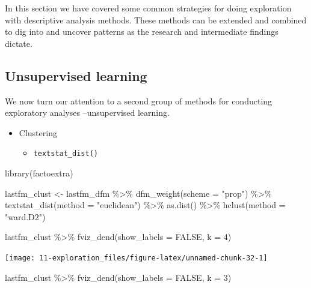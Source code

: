 \documentclass[
]{article}
\newenvironment{Shaded}{\begin{snugshade}}{\end{snugshade}}
\newcommand{\AttributeTok}[1]{\textcolor[rgb]{0.77,0.63,0.00}{#1}}
\newcommand{\ConstantTok}[1]{\textcolor[rgb]{0.00,0.00,0.00}{#1}}
\newcommand{\DecValTok}[1]{\textcolor[rgb]{0.00,0.00,0.81}{#1}}
\newcommand{\FunctionTok}[1]{\textcolor[rgb]{0.00,0.00,0.00}{#1}}
\newcommand{\NormalTok}[1]{#1}
\newcommand{\OtherTok}[1]{\textcolor[rgb]{0.56,0.35,0.01}{#1}}
\newcommand{\SpecialCharTok}[1]{\textcolor[rgb]{0.00,0.00,0.00}{#1}}
\newcommand{\StringTok}[1]{\textcolor[rgb]{0.31,0.60,0.02}{#1}}
\providecommand{\tightlist}{%
  \setlength{\itemsep}{0pt}\setlength{\parskip}{0pt}}
\begin{document}
In this section we have covered some common strategies for doing exploration with descriptive analysis methods. These methods can be extended and combined to dig into and uncover patterns as the research and intermediate findings dictate.

\hypertarget{unsupervised-learning}{%
\subsection{Unsupervised learning}\label{unsupervised-learning}}

We now turn our attention to a second group of methods for conducting exploratory analyses --unsupervised learning.

\begin{itemize}
\tightlist
\item
  Clustering

  \begin{itemize}
  \tightlist
  \item
    \texttt{textstat\_dist()}
  \end{itemize}
\end{itemize}

\begin{Shaded}
\begin{Highlighting}[]
\FunctionTok{library}\NormalTok{(factoextra)}

\NormalTok{lastfm\_clust }\OtherTok{\textless{}{-}}\NormalTok{ lastfm\_dfm }\SpecialCharTok{\%\textgreater{}\%}
    \FunctionTok{dfm\_weight}\NormalTok{(}\AttributeTok{scheme =} \StringTok{"prop"}\NormalTok{) }\SpecialCharTok{\%\textgreater{}\%}
    \FunctionTok{textstat\_dist}\NormalTok{(}\AttributeTok{method =} \StringTok{"euclidean"}\NormalTok{) }\SpecialCharTok{\%\textgreater{}\%}
    \FunctionTok{as.dist}\NormalTok{() }\SpecialCharTok{\%\textgreater{}\%}
    \FunctionTok{hclust}\NormalTok{(}\AttributeTok{method =} \StringTok{"ward.D2"}\NormalTok{)}

\NormalTok{lastfm\_clust }\SpecialCharTok{\%\textgreater{}\%}
    \FunctionTok{fviz\_dend}\NormalTok{(}\AttributeTok{show\_labels =} \ConstantTok{FALSE}\NormalTok{, }\AttributeTok{k =} \DecValTok{4}\NormalTok{)}
\end{Highlighting}
\end{Shaded}

\begin{center}\texttt{[image: 11-exploration\_files/figure-latex/unnamed-chunk-32-1]} \end{center}

\begin{Shaded}
\begin{Highlighting}[]
\NormalTok{lastfm\_clust }\SpecialCharTok{\%\textgreater{}\%}
    \FunctionTok{fviz\_dend}\NormalTok{(}\AttributeTok{show\_labels =} \ConstantTok{FALSE}\NormalTok{, }\AttributeTok{k =} \DecValTok{3}\NormalTok{)}
\end{Highlighting}
\end{Shaded}
\end{document}
